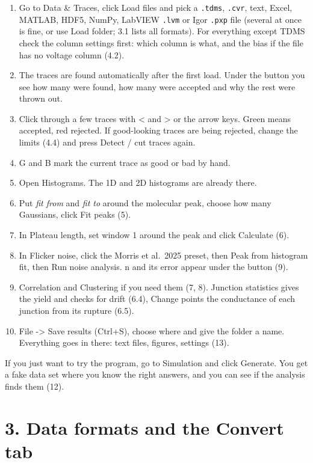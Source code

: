 \documentclass[
  11pt,
  a4paper,
]{article}
\providecommand{\tightlist}{%
  \setlength{\itemsep}{0pt}\setlength{\parskip}{0pt}}
\begin{document}
\begin{enumerate}
\def\labelenumi{\arabic{enumi}.}
\tightlist
\item
  Go to Data \& Traces, click Load files and pick a \texttt{.tdms},
  \texttt{.cvr}, text, Excel, MATLAB, HDF5, NumPy, LabVIEW \texttt{.lvm}
  or Igor \texttt{.pxp} file (several at once is fine, or use Load
  folder; 3.1 lists all formats). For everything except TDMS check the
  column settings first: which column is what, and the bias if the file
  has no voltage column (4.2).
\item
  The traces are found automatically after the first load. Under the
  button you see how many were found, how many were accepted and why the
  rest were thrown out.
\item
  Click through a few traces with \textless{} and \textgreater{} or the
  arrow keys. Green means accepted, red rejected. If good-looking traces
  are being rejected, change the limits (4.4) and press Detect / cut
  traces again.
\item
  G and B mark the current trace as good or bad by hand.
\item
  Open Histograms. The 1D and 2D histograms are already there.
\item
  Put \emph{fit from} and \emph{fit to} around the molecular peak,
  choose how many Gaussians, click Fit peaks (5).
\item
  In Plateau length, set window 1 around the peak and click Calculate
  (6).
\item
  In Flicker noise, click the Morris et al.~2025 preset, then Peak from
  histogram fit, then Run noise analysis. n and its error appear under
  the button (9).
\item
  Correlation and Clustering if you need them (7, 8). Junction
  statistics gives the yield and checks for drift (6.4), Change points
  the conductance of each junction from its rupture (6.5).
\item
  File -\textgreater{} Save results (Ctrl+S), choose where and give the
  folder a name. Everything goes in there: text files, figures, settings
  (13).
\end{enumerate}

If you just want to try the program, go to Simulation and click
Generate. You get a fake data set where you know the right answers, and
you can see if the analysis finds them (12).

\hypertarget{data-formats-and-the-convert-tab}{%
\section{3. Data formats and the Convert
tab}\label{data-formats-and-the-convert-tab}}
\end{document}

